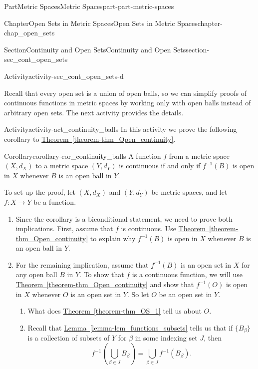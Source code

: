 \documentclass[oneside,10pt,]{book}
\newcommand{\xreffont}{\relax}
\numberwithin{equation}{chapter}
\begin{document}
\begin{partptx}{Part}{Metric Spaces}{}{Metric Spaces}{}{}{part-part-metric-spaces}
\begin{chapterptx}{Chapter}{Open Sets in Metric Spaces}{}{Open Sets in Metric Spaces}{}{}{chapter-chap_open_sets}
\begin{sectionptx}{Section}{Continuity and Open Sets}{}{Continuity and Open Sets}{}{}{section-sec_cont_open_sets}
\begin{activity}{Activity}{}{activity-sec_cont_open_sets-d}
\begin{enumerate}[font=\bfseries,label=(\alph*),ref=\alph*]
\end{enumerate}%
\end{activity}%
Recall that every open set is a union of open balls, so we can simplify proofs of continuous functions in metric spaces by working only with open balls instead of arbitrary open sets. The next activity provides the details.%
\begin{activity}{Activity}{}{activity-act_continuity_balls}%
In this activity we prove the following corollary to \hyperref[theorem-thm_Open_continuity]{Theorem~{\xreffont\ref{theorem-thm_Open_continuity}}}.%
\begin{corollary}{Corollary}{}{}{corollary-cor_continuity_balls}%
A function \(f\) from a metric space \((X,d_X)\) to a metric space \((Y,d_Y)\) is continuous if and only if \(f^{-1}(B)\) is open in \(X\) whenever \(B\) is an open ball in \(Y\).%
\end{corollary}
To set up the proof, let \((X,d_X)\) and \((Y,d_Y)\) be metric spaces, and let \(f: X \to Y\) be a function.%
\begin{enumerate}[font=\bfseries,label=(\alph*),ref=\alph*]%
\item{}Since the corollary is a biconditional statement, we need to prove both implications. First, assume that \(f\) is continuous. Use \hyperref[theorem-thm_Open_continuity]{Theorem~{\xreffont\ref{theorem-thm_Open_continuity}}} to explain why \(f^{-1}(B)\) is open in \(X\) whenever \(B\) is an open ball in \(Y\).%
\item{}For the remaining implication, assume that \(f^{-1}(B)\) is an open set in \(X\) for any open ball \(B\) in \(Y\). To show that \(f\) is a continuous function, we will use \hyperref[theorem-thm_Open_continuity]{Theorem~{\xreffont\ref{theorem-thm_Open_continuity}}} and show that \(f^{-1}(O)\) is open in \(X\) whenever \(O\) is an open set in \(Y\). So let \(O\) be an open set in \(Y\).%
\begin{enumerate}[font=\bfseries,label=(\roman*),ref=\theenumi.\roman*]%
\item{}What does \hyperref[theorem-thm_OS_1]{Theorem~{\xreffont\ref{theorem-thm_OS_1}}} tell us about \(O\).%
\item{}Recall that \hyperref[lemma-lem_functions_subsets]{Lemma~{\xreffont\ref{lemma-lem_functions_subsets}}} tells us that if \(\{B_{\beta}\}\) is a collection of subsets of \(Y\) for \(\beta\) in some indexing set \(J\), then%
\begin{equation*}
f^{-1}\left(\bigcup_{\beta \in J} B_{\beta}\right) = \bigcup_{\beta \in J} f^{-1}(B_{\beta})\text{.}

\end{equation*}
\end{enumerate}
\end{enumerate}
\end{activity}
\end{sectionptx}
\end{chapterptx}
\end{partptx}
\end{document}

